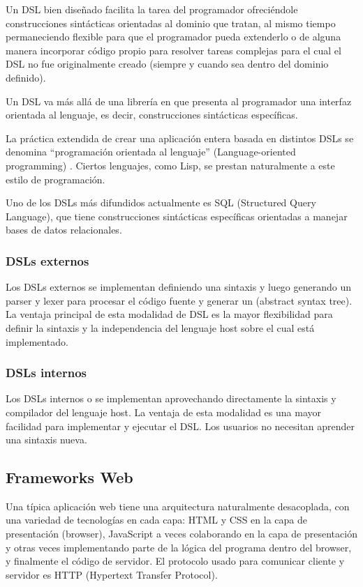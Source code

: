\documentclass[12pt]{article}
\begin{document}
Un DSL bien diseñado facilita la tarea del programador ofreciéndole construcciones sintácticas orientadas al dominio que tratan, al mismo tiempo permaneciendo flexible para que el programador pueda extenderlo o de alguna manera incorporar código propio para resolver tareas complejas para el cual el DSL no fue originalmente creado (siempre y cuando sea dentro del dominio definido).

Un DSL va más allá de una librería en que presenta al programador una interfaz orientada al lenguaje, es decir, construcciones sintácticas específicas.

La práctica extendida de crear una aplicación entera basada en distintos DSLs se denomina “programación orientada al lenguaje” (Language-oriented programming) \cite{Ward95languageoriented} \cite{dmitriev2005language}. Ciertos lenguajes, como Lisp, se prestan naturalmente a este estilo de programación.

Uno de los DSLs más difundidos actualmente es SQL (Structured Query Language), que tiene construcciones sintácticas específicas orientadas a manejar bases de datos relacionales.

\subsubsection{DSLs externos}

Los DSLs externos se implementan definiendo una sintaxis y luego generando un parser y lexer para procesar el código fuente y generar un  (abstract syntax tree). La ventaja principal de esta modalidad de DSL es la mayor flexibilidad para definir la sintaxis y la independencia del lenguaje host sobre el cual está implementado.

\subsubsection{DSLs internos}

Los DSLs internos o  se implementan aprovechando directamente la sintaxis y compilador del lenguaje host. La ventaja de esta modalidad es una mayor facilidad para implementar y ejecutar el DSL. Los usuarios no necesitan aprender una sintaxis nueva.

\subsection{Frameworks Web}

Una típica aplicación web tiene una arquitectura naturalmente desacoplada, con una variedad de tecnologías en cada capa: HTML y CSS en la capa de presentación (browser), JavaScript a veces colaborando en la capa de presentación y otras veces implementando parte de la lógica del programa dentro del browser, y finalmente el código de servidor. El protocolo usado para comunicar cliente y servidor es HTTP (Hypertext Transfer Protocol).
\end{document}
